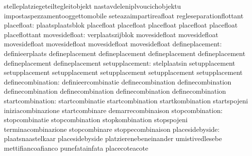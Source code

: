                                   stelleplatziegeteiltegleitobjekt nastavdeleniplvoucichobjektu
                                  impostaspezzamentooggettomobile  seteazaimpartireafloat
                                  regleseparationflottant
                      placefloat: plaatsplaatsblok                 placefloat
                                  placefloat                       placefloat
                                  placefloat                       placefloat
                                  placeflottant
                   movesidefloat: verplaatszijblok                 movesidefloat
                                  movesidefloat                    movesidefloat
                                  movesidefloat                    movesidefloat
                                  movesidefloat
                 defineplacement: definieerplaats                  defineplacement
                                  defineplacement                  defineplacement
                                  defineplacement                  defineplacement
                                  defineplacement
                  setupplacement: stelplaatsin                     setupplacement
                                  setupplacement                   setupplacement
                                  setupplacement                   setupplacement
                                  setupplacement
               definecombination: definieercombinatie              definecombination
                                  definecombination                definecombination
                                  definecombination                definecombination
                                  definecombination
                startcombination: startcombinatie                  startcombination
                                  startkombination                 startspojeni
                                  iniziacombinazione               startcombinare
                                  demarrecombinaison
                 stopcombination: stopcombinatie                   stopcombination
                                  stopkombination                  stopspojeni
                                  terminacombinazione              stopcombinare
                                  stoppecombinaison
                 placesidebyside: plaatsnaastelkaar                placesidebyside
                                  platzierenebeneinander           umistivedlesebe
                                  mettifiancoafianco               punefatainfata
                                  placecoteacote
